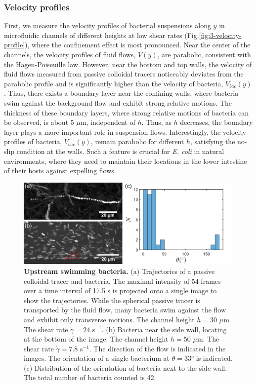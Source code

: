 \subsubsection{Velocity profiles}
First, we measure the velocity profiles of bacterial suspensions along $y$ in microfluidic channels of different heights at low shear rates (Fig.\ref{fig:3-velocity-profile}), where the confinement effect is most pronounced. Near the center of the channels, the velocity profiles of fluid flows, $V(y)$, are parabolic, consistent with the Hagen-Poiseuille law. However, near the bottom and top walls, the velocity of fluid flows measured from passive colloidal tracers noticeably deviates from the parabolic profile and is significantly higher than the velocity of bacteria, $V_{bac}(y)$. Thus, there exists a boundary layer near the confining walls, where bacteria swim against the background flow and exhibit strong relative motions. The thickness of these boundary layers, where strong relative motions of bacteria can be observed, is about 5 $\mu$m, independent of $h$. Thus, as $h$ decreases, the boundary layer plays a more important role in suspension flows. Interestingly, the velocity profiles of bacteria, $V_{bac}(y)$, remain parabolic for different $h$, satisfying the no-slip condition at the walls. Such a feature is
crucial for \textit{E. coli} in natural environments, where they need to maintain their locations in the lower intestine of their hosts against expelling flows.

\begin{figure}[!ht]
	\begin{center}
	\includegraphics[width=5.5 in]{Figs/3-Rheo/4.pdf}
	\end{center}
	\caption[Upstream swimming bacteria in a microfludic viscometer]
	{
	\textbf{Upstream swimming bacteria.}
   (a) Trajectories of a passive colloidal tracer and bacteria. The maximal intensity of 54 frames over a time interval of 17.5 s is projected onto a single image to show the trajectories. While the spherical passive tracer is transported by the fluid flow, many bacteria swim against the flow and exhibit only transverse motions. The channel height $h = 30$ $\mu$m. The shear rate $\dot\gamma = 24$ s$^{-1}$.
   (b) Bacteria near the side wall, locating at the bottom of the image. The channel height $h = 50$ $\mu$m. The shear rate $\dot\gamma = 7.8$ s$^{-1}$. The direction of the flow is indicated in the images. The orientation of a single bacterium at $\theta = 33$° is indicated.
   (c) Distribution of the orientation of bacteria next to the side wall. The total number of bacteria counted is 42.
	}
	\label{fig:3-upstream}
\end{figure}

